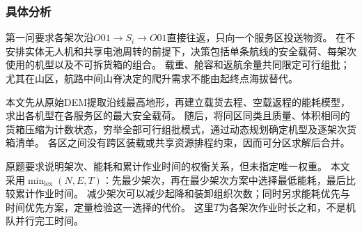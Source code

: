 \subsubsection{具体分析}
\label{sec:q1:analysis}

第一问要求各架次沿$O01\to S_i\to O01$直接往返，只向一个服务区投送物资。
在不安排实体无人机和共享电池周转的前提下，决策包括单条航线的安全载荷、每架次使用的机型以及不可拆货箱的组合。
载重、舱容和返航余量共同限定可行组批；尤其在山区，航路中间山脊决定的爬升需求不能由起终点海拔替代。

本文先从原始DEM提取沿线最高地形，再建立载货去程、空载返程的能耗模型，求出各机型在各服务区的最大安全载荷。
随后，将同区同类且质量、体积相同的货箱压缩为计数状态，穷举全部可行组批模式，通过动态规划确定机型及逐架次货箱清单。
各区之间没有跨区装载或共享资源排程约束，因而可分区求解后合并。

原题要求说明架次、能耗和累计作业时间的权衡关系，但未指定唯一权重。
本文采用$\min_{\mathrm{lex}}(N,E,T)$：先最少架次，再在最少架次方案中选择最低能耗，最后比较累计作业时间。
减少架次可以减少起降和装卸组织次数；同时另求能耗优先与时间优先方案，定量检验这一选择的代价。
这里$T$为各架次作业时长之和，不是机队并行完工时间。
